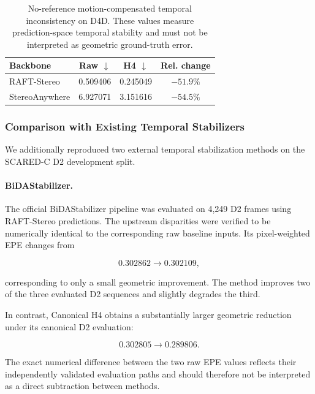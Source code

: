 \documentclass[11pt,a4paper]{article}
\begin{document}
\begin{table}[t]
    \centering
    \caption{
        No-reference motion-compensated temporal inconsistency on D4D.
        These values measure prediction-space temporal stability and must
        not be interpreted as geometric ground-truth error.
    }
    \label{tab:d4d_current}
    \small
    \begin{tabular}{lccc}
        \toprule
        Backbone &
        Raw $\downarrow$ &
        H4 $\downarrow$ &
        Rel. change \\
        \midrule
        RAFT-Stereo
            & 0.509406
            & 0.245049
            & $-51.9\%$ \\

        StereoAnywhere
            & 6.927071
            & 3.151616
            & $-54.5\%$ \\
        \bottomrule
    \end{tabular}
\end{table}


\subsubsection{Comparison with Existing Temporal Stabilizers}

We additionally reproduced two external temporal stabilization methods
on the SCARED-C D2 development split.

\paragraph{BiDAStabilizer.}
The official BiDAStabilizer pipeline was evaluated on 4,249 D2 frames
using RAFT-Stereo predictions.
The upstream disparities were verified to be numerically identical to
the corresponding raw baseline inputs.
Its pixel-weighted EPE changes from

\[
0.302862 \rightarrow 0.302109,
\]

corresponding to only a small geometric improvement.
The method improves two of the three evaluated D2 sequences and slightly
degrades the third.

In contrast, Canonical H4 obtains a substantially larger geometric
reduction under its canonical D2 evaluation:

\[
0.302805 \rightarrow 0.289806.
\]

The exact numerical difference between the two raw EPE values reflects
their independently validated evaluation paths and should therefore not
be interpreted as a direct subtraction between methods.
\end{document}
